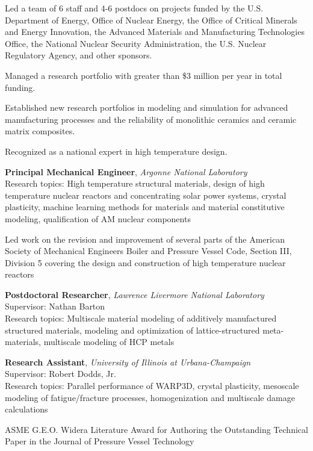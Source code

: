 Led a team of 6 staff and 4-6 postdocs on projects funded by the U.S. Department of Energy, 
Office of Nuclear Energy, the Office of Critical Minerals and Energy Innovation, the Advanced Materials and Manufacturing Technologies Office,
the National Nuclear Security Administration, the U.S. Nuclear Regulatory Agency,
and other sponsors.

Managed a research portfolio with greater than \$3 million per year in total funding.  

Established new research portfolios in modeling and simulation for advanced manufacturing processes and the reliability of monolithic ceramics and ceramic matrix composites.

Recognized as a national expert in high temperature design.

\textbf{Principal Mechanical Engineer}, \emph{Argonne National Laboratory}
\\
Research topics: High temperature structural materials, design
of high temperature nuclear reactors and concentrating solar power systems,
crystal plasticity, machine learning
methods for materials and material constitutive modeling,
qualification of AM nuclear components

Led work on the revision and improvement of several parts of the American Society of 
Mechanical Engineers Boiler and Pressure Vessel Code, Section III, Division 5 covering the
design and construction of high temperature nuclear reactors

\textbf{Postdoctoral Researcher}, \emph{Lawrence Livermore National
Laboratory} \\
Supervisor: Nathan Barton \\
Research topics: Multiscale material modeling of additively manufactured
structured materials, modeling and optimization of lattice-structured
meta-materials, multiscale modeling of HCP metals

\textbf{Research Assistant}, \emph{University of Illinois at Urbana-Champaign}
\\
Supervisor: Robert Dodds, Jr. \\
Research topics: Parallel performance of WARP3D, crystal plasticity,
mesoscale modeling of fatigue/fracture processes, homogenization and
multiscale damage calculations


ASME  G.E.O. Widera Literature Award for Authoring the Outstanding Technical Paper in the Journal of Pressure Vessel Technology 

